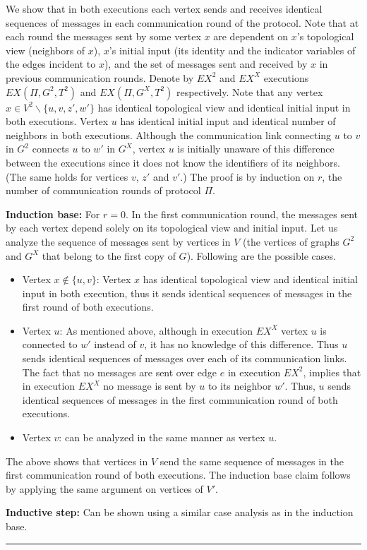 \documentclass[11pt,letter]{article}
\def\sminus{\smallsetminus}
\newcommand{\qed}{\rule{7pt}{7pt}}
\newenvironment{proof}{\noindent{\bf Proof}\hspace*{1em}}{\qed\bigskip}
\begin{document}
\begin{proof}
We show that in both executions each vertex sends and receives identical 
sequences of messages in each communication round of the protocol. 
Note that at each round the messages sent by some vertex $x$ are dependent 
on $x$'s topological view (neighbors of $x$), $x$'s initial input 
(its identity and the indicator variables of the edges incident to $x$), and 
the set of messages sent and received by $x$ in previous communication rounds.
Denote by $EX^2$ and  $EX^X$ executions $EX(\Pi, G^2, T^2)$ and  
$EX(\Pi, G^X, T^2)$ respectively. Note that any vertex 
$x\in V^2\sminus\{u,v,z',w'\}$ has identical topological view and 
identical initial input in both executions. Vertex $u$ has identical 
initial input and  identical number of neighbors in both  executions. 
Although the communication link connecting $u$ to $v$ in $G^2$ connects 
$u$ to $w'$ in $G^X$, vertex $u$ is initially unaware of this difference 
between the executions since it does not know the identifiers of its neighbors.
(The same holds for vertices $v$, $z'$ and $v'$.) 
The proof is by induction on $r$, 
the number of communication rounds of protocol $\Pi$.

\noindent\textbf{Induction base:} For $r=0$. In the first communication round, 
the messages sent by each vertex depend solely on its topological view 
and initial input. Let us analyze the sequence of messages sent by vertices 
in $V$ (the vertices of graphs $G^2$ and $G^X$ that belong to the first copy 
of $G$). Following are the possible cases.

\begin{itemize}
\item Vertex $x\notin \{u,v\}$: Vertex $x$ has identical topological view 
and identical initial input in both execution, thus it sends identical 
sequences of messages in the first round of both executions.
\item
Vertex $u$: As mentioned above, although in execution $EX^X$ vertex $u$ 
is connected to $w'$ instead of $v$, it has no knowledge of this difference. 
Thus $u$  sends identical sequences of messages over each of its communication 
links. The fact that no messages are sent over edge $e$ in execution $EX^2$, 
implies that in execution $EX^X$ no message is sent by $u$ to its 
neighbor $w'$. Thus, $u$ sends identical sequences of messages in the 
first communication round of both executions.
\item
Vertex $v$: can be analyzed in the same manner as vertex $u$.
\end{itemize}
\noindent
The above shows that  vertices in $V$ send the same sequence of messages 
in the first communication round of both executions. The induction base claim 
follows by applying the same argument on vertices of $V'$.

\noindent\textbf{Inductive step:} Can be shown using a similar case analysis as 
in the induction base.
\end{proof}
\end{document}
